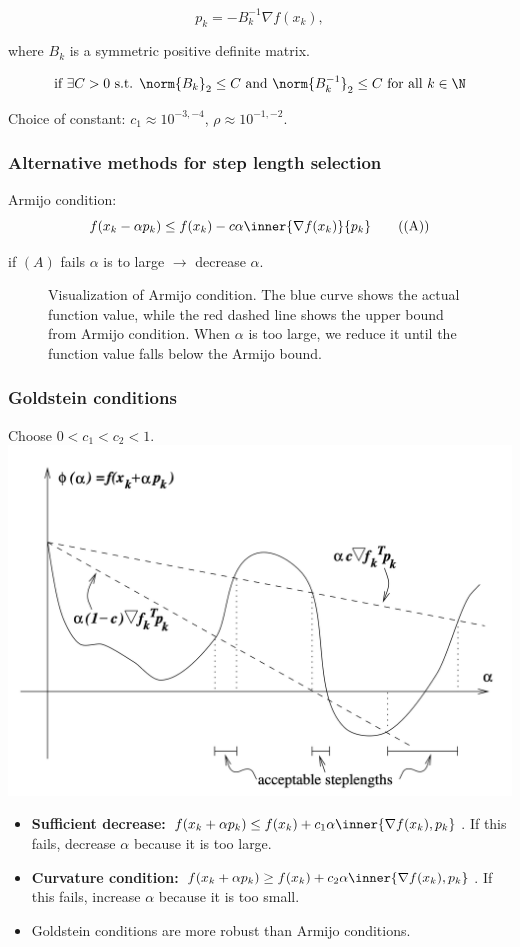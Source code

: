 \[
	p_k = - B_k^{-1} \nabla f(x_k),
\]

where  \(B_k\) is a symmetric positive definite matrix.

\[
	\text{if } \exists C > 0 \text{ s.t. } \norm{B_k}_2 \leq C \text{ and } \norm{B_k^{-1}}_2 \leq C \text{ for all } k \in \N
\]

Choice of constant:  \(c_1 \approx 10^{-3,-4}\),  \(\rho \approx 10^{-1,-2}\).

\subsubsection*{Alternative methods for step length selection}

Armijo condition:
\[
	f(x_k - \alpha p_k) \leq f(x_k) - c \alpha \inner{\nabla f(x_k)}{p_k} \tag{(A)}
\]

if  \((A)\) fails  \(\alpha\) is to large  \(\to\) decrease  \(\alpha\).

\begin{figure}[H]
	\centering
	\caption{Visualization of Armijo condition. The blue curve shows the actual function value, while the red dashed line shows the upper bound from Armijo condition. When  \(\alpha\) is too large, we reduce it until the function value falls below the Armijo bound.}
\end{figure}

\subsubsection*{Goldstein conditions}
Choose  \(0 < c_1 < c_2 < 1\).
\includegraphics[scale=0.5]{figures/goldstein_conditions.png}
\begin{itemize}
	\item \textbf{Sufficient decrease:}  \(f(x_k + \alpha p_k) \leq f(x_k) + c_1 \alpha \inner{\nabla f(x_k), p_k}\). If this fails, decrease  \(\alpha\) because it is too large.
	\item \textbf{Curvature condition:}  \(f(x_k + \alpha p_k) \geq f(x_k) + c_2 \alpha \inner{\nabla f(x_k), p_k}\). If this fails, increase  \(\alpha\) because it is too small.
	\item Goldstein conditions are more robust than Armijo conditions.
\end{itemize}

